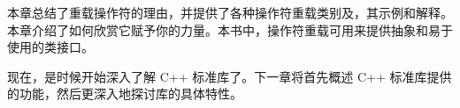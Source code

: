 本章总结了重载操作符的理由，并提供了各种操作符重载类别及，其示例和解释。本章介绍了如何欣赏它赋予你的力量。本书中，操作符重载可用来提供抽象和易于使用的类接口。

现在，是时候开始深入了解 C++ 标准库了。下一章将首先概述 C++ 标准库提供的功能，然后更深入地探讨库的具体特性。
